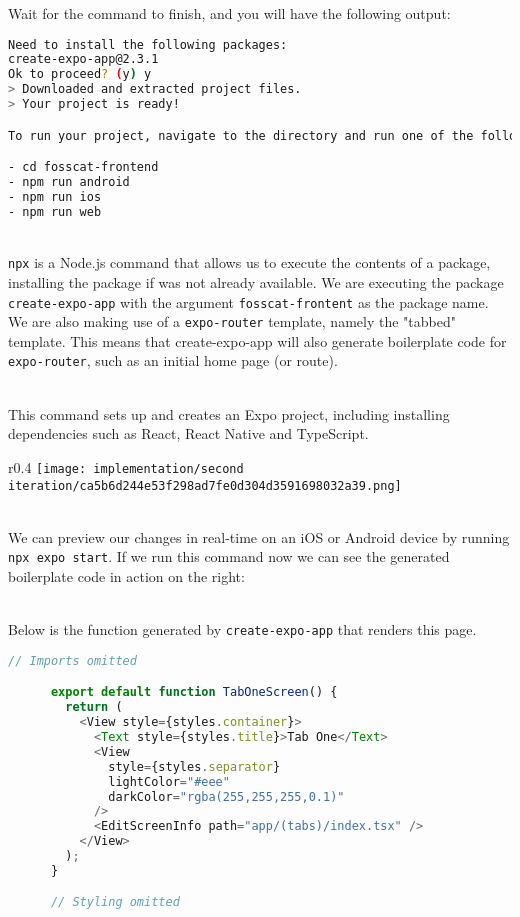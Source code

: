 \documentclass[../../main.tex]{subfiles}
\begin{document}
\noindent Wait for the command to finish, and you will have the following output:

\begin{lstlisting}[language=bash]
Need to install the following packages:
create-expo-app@2.3.1
Ok to proceed? (y) y
> Downloaded and extracted project files.
> Your project is ready!

To run your project, navigate to the directory and run one of the following npm commands.

- cd fosscat-frontend
- npm run android
- npm run ios
- npm run web
\end{lstlisting}

\noindent \\ \lstinline{npx} is a Node.js command that allows us to execute the contents of a package,
installing the package if was not already available. We are executing the package \lstinline{create-expo-app}
with the argument \lstinline{fosscat-frontent} as the package name.
We are also making use of a \lstinline{expo-router} template, namely the "tabbed" template.
This means that create-expo-app will also generate boilerplate code for \lstinline{expo-router},
such as an initial home page (or route).

\noindent \\ This command sets up and creates an Expo project, including installing dependencies such as
React, React Native and TypeScript.

\pagebreak

\begin{dummyenv}

  \begin{wrapfigure}{r}{0.4\textwidth}
    \texttt{[image: implementation/second iteration/ca5b6d244e53f298ad7fe0d304d3591698032a39.png]}
    \label{fig:wrapfig}
  \end{wrapfigure}

  \noindent \\ We can preview our changes in real-time on an iOS or Android device by running \lstinline{npx expo start}.
  If we run this command now we can see the generated boilerplate code in action on the right:

  \noindent \\ Below is the function generated by
  \lstinline{create-expo-app} that renders this page.

  \begin{lstlisting}[language=typescript, breaklines=false]
      // Imports omitted

      export default function TabOneScreen() {
        return (
          <View style={styles.container}>
            <Text style={styles.title}>Tab One</Text>
            <View
              style={styles.separator}
              lightColor="#eee"
              darkColor="rgba(255,255,255,0.1)"
            />
            <EditScreenInfo path="app/(tabs)/index.tsx" />
          </View>
        );
      }

      // Styling omitted
    \end{lstlisting}

\end{dummyenv}
\end{document}
